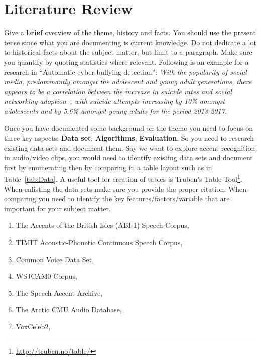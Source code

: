 \section{Literature Review}
\label{sec:Lit}
\par Give a \textbf{brief} overview of the theme, history and facts. You should use the present tense since what you are documenting is current knowledge. Do not dedicate a lot to historical facts about the subject matter, but limit to a paragraph. Make sure you quantify by quoting statistics where relevant. Following is an example for a research in \enquote{Automatic cyber-bullying detection}: \textit{With the popularity of social media, predominantly amongst the adolescent and young adult generations, there appears to be a correlation between the increase in suicide rates and social networking adoption~\cite{miron2019suicide}, with suicide attempts increasing by 10\% amongst adolescents and by 5.6\% amongst young adults for the period 2013-2017.} 

\par Once you have documented some background on the theme you need to focus on three key aspects: \textbf{Data set}; \textbf{Algorithms}; \textbf{Evaluation}. So you need to research existing data sets and document them. Say we want to explore accent recognition in audio/video clips, you would need to identify existing data sets and document first by enumerating then by comparing in a table layout such as in Table~\ref{tab:Data}. A useful tool for creation of tables is Truben's Table Tool\footnote{\url{http://truben.no/table/}}. When enlisting the data sets make sure you provide the proper citation. When comparing you need to identify the key features/factors/variable that are important for your subject matter.

\begin{enumerate}
    \item The Accents of the British Isles (ABI-1) Speech Corpus, \cite{d2004accents}
    \item TIMIT Acoustic-Phonetic Continuous Speech Corpus, \cite{garofalo1993darpa}
    \item Common Voice Data Set, \cite{common_voice}
    \item WSJCAM0 Corpus, \cite{robinson1995wsjcamo}
    \item The Speech Accent Archive, \cite{weinberger2011speech}
    \item The Arctic CMU Audio Database, \cite{kominek2004cmu}
    \item VoxCeleb2, \cite{chung2018voxceleb2} 
\end{enumerate}

